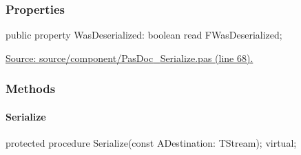 \documentclass{report}
\newif\ifpdf
\begin{document}
\subsubsection*{\large{\textbf{Properties}}\normalsize\hspace{1ex}\hfill}
\begin{list}{}{
\setlength{\itemindent}{0cm}
\setlength{\listparindent}{0cm}
\setlength{\leftmargin}{\evensidemargin}
\addtolength{\leftmargin}{\tmplength}
\settowidth{\labelsep}{X}
\addtolength{\leftmargin}{\labelsep}
\setlength{\labelwidth}{\tmplength}
}
\label{PasDoc_Serialize.TSerializable-WasDeserialized}
\item[\textbf{WasDeserialized}\hfill]
\ifpdf
\begin{flushleft}
\fi
\begin{ttfamily}
public property WasDeserialized: boolean read FWasDeserialized;\end{ttfamily}

\ifpdf
\end{flushleft}
\fi


\par  \par
\href{https://github.com/pasdoc/pasdoc/blob/master/source/component/PasDoc_Serialize.pas#L68}{Source: source/component/PasDoc{\_}Serialize.pas (line 68).}\end{list}
\subsubsection*{\large{\textbf{Methods}}\normalsize\hspace{1ex}\hfill}
\paragraph*{Serialize}\hspace*{\fill}

\label{PasDoc_Serialize.TSerializable-Serialize}
\begin{list}{}{
\setlength{\itemindent}{0cm}
\setlength{\listparindent}{0cm}
\setlength{\leftmargin}{\evensidemargin}
\addtolength{\leftmargin}{\tmplength}
\settowidth{\labelsep}{X}
\addtolength{\leftmargin}{\labelsep}
\setlength{\labelwidth}{\tmplength}
}
\item[\textbf{Declaration}\hfill]
\ifpdf
\begin{flushleft}
\fi
\begin{ttfamily}
protected procedure Serialize(const ADestination: TStream); virtual;\end{ttfamily}

\ifpdf
\end{flushleft}
\fi

\end{list}
\end{document}
